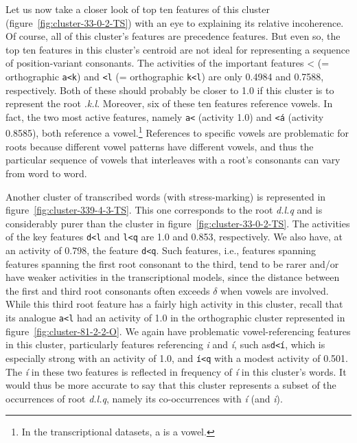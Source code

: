 Let us now take a closer look of top ten features of this cluster (figure~\ref{fig:cluster-33-0-2-TS}) with an eye to explaining its relative incoherence. 
Of course, all of this cluster's features are precedence features. But even so, the top ten features in this cluster's centroid are not ideal for representing 
a %
sequence of position-variant consonants.
The activities of the important features 
{<} (= orthographic \texttt{a<k}) and \texttt{<l} (= orthographic \texttt{k<l}) are only 0.4984 and
 0.7588, respectively. Both of these should probably be closer to 1.0 if this cluster is to represent the
 root \textit{{.k.l}}. Moreover, six of these ten features reference vowels. 
In fact, the two most active features, namely \texttt{a<} (activity 1.0) and \texttt{<\'{a}} (activity 0.8585), both reference a vowel.\footnote{In the transcriptional datasets, \textsf{a} is a vowel.} References to specific vowels are problematic for roots because different vowel patterns have different vowels, and thus the particular sequence of vowels that interleaves with a root's consonants can vary from word to word.

Another cluster of transcribed words (with stress-marking) is represented in figure~\ref{fig:cluster-339-4-3-TS}. 
This one corresponds to the root \textit{d.l.q} and is considerably purer than the 
cluster in figure~\ref{fig:cluster-33-0-2-TS}. The activities of the key features \texttt{d<l} and \texttt{l<q}  
are 1.0 and 0.853, respectively. We also have, at an activity of 0.798, the feature \texttt{d<q}. Such features, i.e., features spanning 
features spanning the first root consonant to the third, tend to be rarer and/or have weaker activities in the transcriptional models, 
since the distance between the first and third root consonants often exceeds $\delta$ when vowels are 
involved. While this third root feature has a fairly high activity in this cluster, recall that its analogue \texttt{a<l} had an activity of 1.0 in the orthographic cluster represented in figure~\ref{fig:cluster-81-2-2-O}. We again have problematic vowel-referencing features in this cluster, particularly features 
referencing \textit{i} and \textit{\'{i}}, such as\texttt{d<\'{i}}, which is especially strong with an activity of 1.0, and \texttt{\'{i}<q} with  
 a modest activity of 0.501. The \textit{\'{i}} in these two features is reflected in frequency of \textit{\'{i}} in 
this cluster's words. It would thus be more accurate to say that this cluster represents a subset of the 
occurrences of root \textit{d.l.q}, namely its co-occurrences with \textit{\'{i}} (and \textit{i}).


